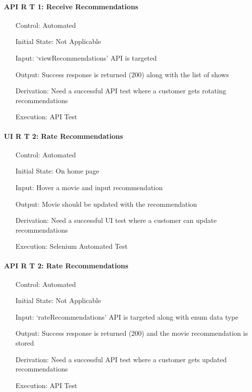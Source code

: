 \documentclass[12pt, titlepage]{article}
\begin{document}
\paragraph*{API R T 1: Receive Recommendations}
\begin{itemize}
	\item[Control:] Automated
	\item[Initial State:] Not Applicable
	\item[Input:] `viewRecommendations' API is targeted
	\item[Output:] Success response is returned (200) along with the list of shows
	\item[Derivation:] Need a successful API test where a customer gets rotating recommendations
	\item[Execution:] API Test
\end{itemize}

\paragraph*{UI R T 2: Rate Recommendations}
\begin{itemize}
	\item[Control:] Automated
	\item[Initial State:] On home page
	\item[Input:] Hover a movie and input recommendation
	\item[Output:] Movie should be updated with the recommendation
	\item[Derivation:] Need a successful UI test where a customer can update recommendations
	\item[Execution:] Selenium Automated Test
\end{itemize}

\paragraph*{API R T 2: Rate Recommendations}
\begin{itemize}
	\item[Control:] Automated
	\item[Initial State:] Not Applicable
	\item[Input:] `rateRecommendations' API is targeted along with enum data type
	\item[Output:] Success response is returned (200) and the movie recommendation is stored
	\item[Derivation:] Need a successful API test where a customer gets updated recommendations
	\item[Execution:] API Test
\end{itemize}
\end{document}
